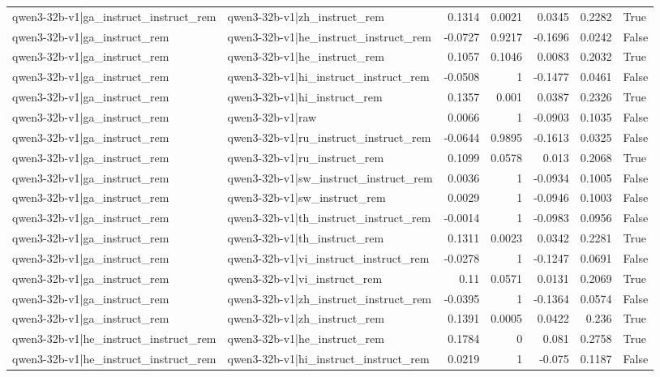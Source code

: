 \begin{table}
\begin{tabular}{l l r r r r l}
qwen3-32b-v1|ga_instruct_instruct_rem & qwen3-32b-v1|zh_instruct_rem & 0.1314 & 0.0021 & 0.0345 & 0.2282 & True \\
qwen3-32b-v1|ga_instruct_rem & qwen3-32b-v1|he_instruct_instruct_rem & -0.0727 & 0.9217 & -0.1696 & 0.0242 & False \\
qwen3-32b-v1|ga_instruct_rem & qwen3-32b-v1|he_instruct_rem & 0.1057 & 0.1046 & 0.0083 & 0.2032 & True \\
qwen3-32b-v1|ga_instruct_rem & qwen3-32b-v1|hi_instruct_instruct_rem & -0.0508 & 1 & -0.1477 & 0.0461 & False \\
qwen3-32b-v1|ga_instruct_rem & qwen3-32b-v1|hi_instruct_rem & 0.1357 & 0.001 & 0.0387 & 0.2326 & True \\
qwen3-32b-v1|ga_instruct_rem & qwen3-32b-v1|raw & 0.0066 & 1 & -0.0903 & 0.1035 & False \\
qwen3-32b-v1|ga_instruct_rem & qwen3-32b-v1|ru_instruct_instruct_rem & -0.0644 & 0.9895 & -0.1613 & 0.0325 & False \\
qwen3-32b-v1|ga_instruct_rem & qwen3-32b-v1|ru_instruct_rem & 0.1099 & 0.0578 & 0.013 & 0.2068 & True \\
qwen3-32b-v1|ga_instruct_rem & qwen3-32b-v1|sw_instruct_instruct_rem & 0.0036 & 1 & -0.0934 & 0.1005 & False \\
qwen3-32b-v1|ga_instruct_rem & qwen3-32b-v1|sw_instruct_rem & 0.0029 & 1 & -0.0946 & 0.1003 & False \\
qwen3-32b-v1|ga_instruct_rem & qwen3-32b-v1|th_instruct_instruct_rem & -0.0014 & 1 & -0.0983 & 0.0956 & False \\
qwen3-32b-v1|ga_instruct_rem & qwen3-32b-v1|th_instruct_rem & 0.1311 & 0.0023 & 0.0342 & 0.2281 & True \\
qwen3-32b-v1|ga_instruct_rem & qwen3-32b-v1|vi_instruct_instruct_rem & -0.0278 & 1 & -0.1247 & 0.0691 & False \\
qwen3-32b-v1|ga_instruct_rem & qwen3-32b-v1|vi_instruct_rem & 0.11 & 0.0571 & 0.0131 & 0.2069 & True \\
qwen3-32b-v1|ga_instruct_rem & qwen3-32b-v1|zh_instruct_instruct_rem & -0.0395 & 1 & -0.1364 & 0.0574 & False \\
qwen3-32b-v1|ga_instruct_rem & qwen3-32b-v1|zh_instruct_rem & 0.1391 & 0.0005 & 0.0422 & 0.236 & True \\
qwen3-32b-v1|he_instruct_instruct_rem & qwen3-32b-v1|he_instruct_rem & 0.1784 & 0 & 0.081 & 0.2758 & True \\
qwen3-32b-v1|he_instruct_instruct_rem & qwen3-32b-v1|hi_instruct_instruct_rem & 0.0219 & 1 & -0.075 & 0.1187 & False \\

\end{tabular}
\end{table}
